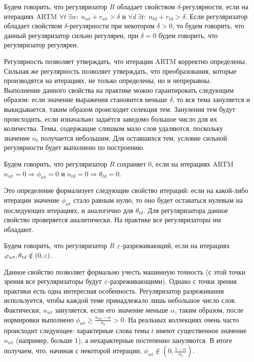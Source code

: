 \documentclass[12pt, twoside]{article}
\begin{document}
\begin{Definition}
\label{strongreg}
Будем говорить, что регуляризатор $ R$ обладает свойством $\delta$-регулярности, если на итерациях ARTM $\forall t~\exists w \colon~n_{wt} + r_{wt} > \delta$ и $\forall d~\exists t \colon~n_{td} + r_{td} > \delta$. Если регуляризатор  обладает свойством $\delta$-регулярности при некотором $\delta > 0$, то будем говорить, что данный регуляризатор сильно регулярен, при $\delta=0$ будем говорить, что регуляризатор регулярен.
\end{Definition}

 Регулярность позволяет утверждать, что итерации ARTM корректно определены. Сильная же регулярность позволяет утверждать, что преобразования, которые производятся на итерациях, не только определены, но и непрерывны. Выполнение данного свойства на практике  можно гарантировать следующим образом: если значение выражения становится меньше $\delta$, то вся тема зануляется  и выкидывается, таким образом происходит селекция тем. Зануления тем будут происходить, если  изначально задаётся заведомо большое число для их количества. Темы, содержащие слишком мало слов удаляются, поскольку значение $n_t$ получается небольшим. Для оставшихся тем, условие сильной регулярности будет выполнено по построению.
 
\begin{Definition}
Будем говорить, что регуляризатор $R$ сохраняет 0, если на итерациях ARTM $n_{wt} = 0 \Rightarrow \phi_{wt} = 0$ и $n_{td} = 0 \Rightarrow \theta_{td} = 0$.
\end{Definition}

Это определение формализует следующие свойство итераций: если на какой-либо итерации значение $\phi_{wt}$ стало равным нулю, то оно будет оставаться нулевым на последующих итерациях, и аналогично для $\theta_{td}$. Для регуляризатора данное свойство проверяется аналитически. На практике все регуляризаторы им обладают.

\begin{Definition}
\label{sparsereg}
Будем говорить, что регуляризатор $ R$ $\varepsilon$-разреживающий, если на итерациях $\varphi_{wt}, \theta_{td} \notin (0, \varepsilon)$.
\end{Definition}

Данное свойство позволяет формально учесть машинную точность (с этой точки зрения все регуляризаторы будут $\varepsilon$-разреживающими). Однако с точки зрения практики есть одна интересная особенность. Регуляризатор разреживания используется, чтобы каждой теме принадлежало лишь небольшое число слов. Фактически,  $n_{wt}$ зануляется, если его значение меньше $\alpha$, таким образом, после нормировки выполнено $\phi_{wt} \geq \frac{n_{wt} - \alpha}{n_t} > 0$.  На реальных коллекциях очень часто происходит следующее: характерные слова темы $t$ имеют существенное значение $n_{wt}$ (например, больше 1), а нехарактерные постепенно зануляются. В итоге получаем, что, начиная с некоторой итерации, $\phi_{wt} \notin (0, \frac{1-\alpha}{n_t})$.
\end{document}
